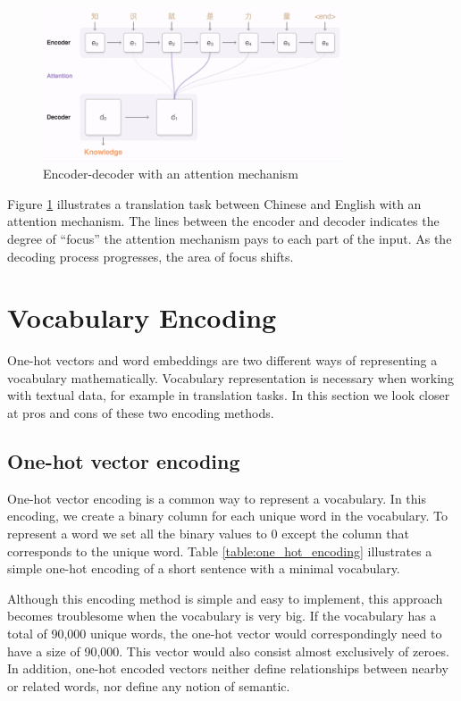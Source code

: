 \begin{figure}[ht]
    \centering
    \includegraphics[width=0.8\textwidth]{fig/background_theory/attention_chinese.png}
    \caption{Encoder-decoder with an attention mechanism}
    \label{fig:encoder-decoder-attention-google}
\end{figure}

Figure \ref{fig:encoder-decoder-attention-google} illustrates a translation task between Chinese and English with an attention mechanism. The lines between the encoder and decoder indicates the degree of ``focus'' the attention mechanism pays to each part of the input. As the decoding process progresses, the area of focus shifts.


\section{Vocabulary Encoding}
\label{sec:vocabulary_encoding}
One-hot vectors and word embeddings are two different ways of representing a vocabulary mathematically. Vocabulary representation is necessary when working with textual data, for example in translation tasks. In this section we look closer at pros and cons of these two encoding methods.

\subsection{One-hot vector encoding}
One-hot vector encoding is a common way to represent a vocabulary. In this encoding, we create a binary column for each unique word in the vocabulary. To represent a word we set all the binary values to \(0\) except the column that corresponds to the unique word. Table  \ref{table:one_hot_encoding} illustrates a simple one-hot encoding of a short sentence with a minimal vocabulary. 

Although this encoding method is simple and easy to implement, this approach becomes troublesome when the vocabulary is very big. If the vocabulary has a total of 90,000 unique words, the one-hot vector would correspondingly need to have a size of 90,000. This vector would also consist almost exclusively of zeroes. In addition, one-hot encoded vectors neither define relationships between nearby or related words, nor define any notion of semantic.

